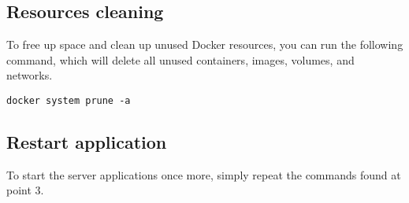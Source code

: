 \subsection{Resources cleaning}

To free up space and clean up unused Docker resources, you can run the following command, which will delete all unused containers, images, volumes, and networks.

\begin{center}
\verb|docker system prune -a|
\end{center}

\subsection{Restart application}

To start the server applications once more, simply repeat the commands found at point 3.
